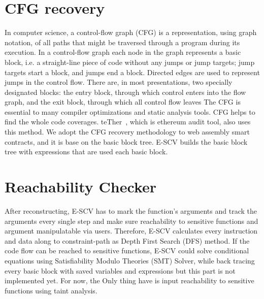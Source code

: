 \section{CFG recovery}
In computer science, a control-flow graph (CFG) is a representation, using graph notation, of all paths that might be traversed through a program during its execution.
In a control-flow graph each node in the graph represents a basic block, i.e. a straight-line piece of code without any jumps or jump targets; jump targets start a block, and jumps end a block. Directed edges are used to represent jumps in the control flow. There are, in most presentations, two specially designated blocks: the entry block, through which control enters into the flow graph, and the exit block, through which all control flow leaves
 The CFG is essential to many compiler optimizations and static analysis tools. CFG helps to find the whole code coverages. teTher~\cite{krupp2018teether}, which is ethereum audit tool, also uses this method. We adopt the CFG recovery methodology to web assembly smart contracts, and it is base on the basic block tree. E-SCV builds the basic block tree with expressions that are used each basic block.



\section{Reachability Checker}
After reconstructing, E-SCV has to mark the function's arguments and track the arguments every single step and make sure reachability to sensitive functions and argument manipulatable via users. Therefore, E-SCV calculates every instruction and data along to constraint-path as Depth First Search (DFS) method. If the code flow can be reached to sensitive functions, E-SCV could solve conditional equations using Satisfiability Modulo Theories (SMT) Solver, while back tracing every basic block with saved variables and expressions but this part is not implemented yet. For now, the Only thing have is input reachability to sensitive functions using taint analysis.


